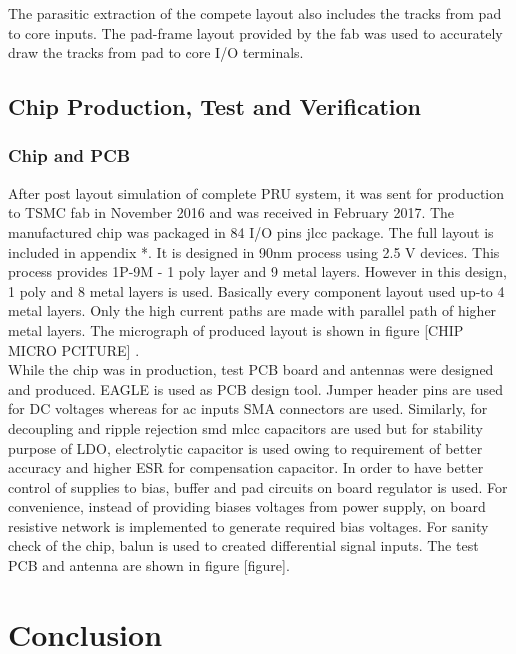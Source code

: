 \documentclass[UKenglish]{ifimaster}  %
\begin{document}
The parasitic extraction of the compete layout also includes the tracks from pad to core inputs. The pad-frame layout provided by the fab was used to accurately draw the tracks from pad to core I/O terminals. \\


\chapter{Chip Production, Test and Verification}

\section{Chip and PCB}
After post layout simulation of complete PRU system, it was sent for production to TSMC fab in November 2016 and was received in February 2017. The  manufactured chip was packaged in 84 I/O pins \acrshort{jlcc} package. The full layout is included in appendix *. It is designed in 90nm process using 2.5 V devices. This process provides 1P-9M - 1 poly layer and 9 metal layers. However in this design, 1 poly and 8 metal layers is used. Basically every component layout used up-to 4 metal layers. Only the high current paths are made with parallel path of higher metal layers. The micrograph of produced layout is shown in figure [CHIP MICRO PCITURE] .\\

While the chip was in production, test PCB board and antennas were designed and produced. EAGLE is used as PCB design tool. Jumper header pins are used for DC voltages whereas for ac inputs SMA connectors are used. Similarly, for decoupling and ripple rejection \acrshort{smd} \acrshort{mlcc} capacitors are used but  for stability purpose of LDO, electrolytic capacitor is used owing to requirement of better accuracy and higher ESR for compensation capacitor.  In order to have better control of supplies to bias, buffer and pad circuits on board regulator is used. For convenience, instead of providing biases voltages from power supply, on board resistive network is implemented to generate required bias voltages. For sanity check of the chip, balun is used to created differential signal inputs. The test PCB and antenna are shown in figure [figure].\\


\part{Conclusion}
\end{document}
